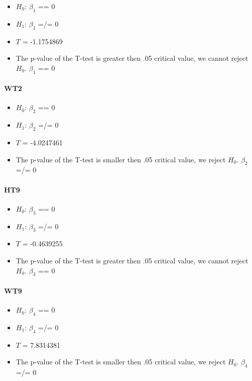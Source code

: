 \documentclass[]{article}
\providecommand{\tightlist}{%
  \setlength{\itemsep}{0pt}\setlength{\parskip}{0pt}}
\let\oldparagraph\paragraph
\renewcommand{\paragraph}[1]{\oldparagraph{#1}\mbox{}}
\begin{document}
\begin{itemize}
\tightlist
\item
  \(H_{0}\): \(\beta_{1}\) == 0
\item
  \(H_{1}\): \(\beta_{1}\) =/= 0
\item
  \(T\) = -1.1754869
\item
  The p-value of the T-test is greater then .05 critical value, we
  cannot reject \(H_{0}\). \(\beta_{1}\) == 0 
\end{itemize}

\paragraph{WT2}\label{wt2}

\begin{itemize}
\tightlist
\item
  \(H_{0}\): \(\beta_{2}\) == 0
\item
  \(H_{1}\): \(\beta_{2}\) =/= 0
\item
  \(T\) = -4.0247461
\item
  The p-value of the T-test is smaller then .05 critical value, we
  reject \(H_{0}\). \(\beta_{2}\) =/= 0 
\end{itemize}

\paragraph{HT9}\label{ht9}

\begin{itemize}
\tightlist
\item
  \(H_{0}\): \(\beta_{3}\) == 0
\item
  \(H_{1}\): \(\beta_{3}\) =/= 0
\item
  \(T\) = -0.4639255
\item
  The p-value of the T-test is greater then .05 critical value, we
  cannot reject \(H_{0}\). \(\beta_{3}\) == 0 
\end{itemize}

\paragraph{WT9}\label{wt9}

\begin{itemize}
\tightlist
\item
  \(H_{0}\): \(\beta_{4}\) == 0
\item
  \(H_{1}\): \(\beta_{4}\) =/= 0
\item
  \(T\) = 7.8314381
\item
  The p-value of the T-test is smaller then .05 critical value, we
  reject \(H_{0}\). \(\beta_{4}\) =/= 0 
\end{itemize}
\end{document}
